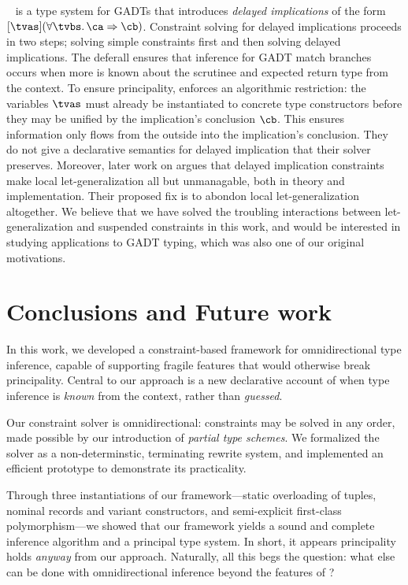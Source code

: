 \documentclass[acmsmall,screen,nonacm,review]{acmart}
\begin{document}
\OutsideIn~\citep*{conf/icfp/SchrijversJSV09} is a type system for GADTs that
introduces \emph{delayed implications} of the form $\where{\tvs}(\all \tvbs \ca
\Rightarrow \cb)$. Constraint solving for delayed implications proceeds in two
steps; solving simple constraints first and then solving delayed implications.
The deferall ensures that inference for GADT match branches occurs when more is
known about the scrutinee and expected return type from the context.
%
To ensure principality, \OutsideIn enforces an algorithmic
restriction: the variables $\tvs$ must already be instantiated to
concrete type constructors before they may be unified by the
implication's conclusion $\cb$. This ensures information only flows
from the outside into the implication's conclusion. They do not give
a declarative semantics for delayed implication that their solver
preserves. Moreover, later work on \OutsideIn argues
\citep*{Vytiniotis-Peyton-Jones-Schrijvers-Sulzmann/outsidein@jfp2011}
that delayed implication constraints make local let-generalization all
but unmanagable, both in theory and implementation. Their proposed fix
is to abondon local let-generalization altogether. We believe that we
have solved the troubling interactions between let-generalization and
suspended constraints in this work, and would be interested in
studying applications to GADT typing, which was also one of our
original motivations.

\section{Conclusions and Future work}
\label{sec:discussion}
\label{sec:future-work}

In this work, we developed a constraint-based framework for omnidirectional
type inference, capable of supporting fragile features that would otherwise
break principality.
%
Central to our approach is a new declarative account of when type inference is
\emph{known} from the context, rather than \emph{guessed}.

Our constraint solver is omnidirectional: constraints may be solved in any
order, made possible by our introduction of \emph{partial type schemes}.
We formalized the solver as a non-determinstic, terminating rewrite system,
and implemented an efficient prototype to demonstrate its practicality.

Through three instantiations of our framework---static overloading
of tuples, nominal records and variant constructors, and semi-explicit first-class
polymorphism---we showed that our framework yields a sound and complete inference
algorithm and a principal type system. In short, it appears principality holds
\emph{anyway} from our approach.  
%
Naturally, all this begs the question: what else can be done with omnidirectional
inference beyond the features of \OML?
\end{document}
